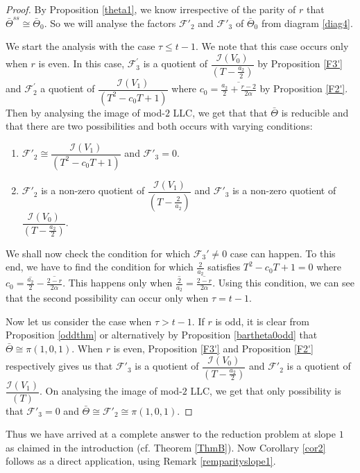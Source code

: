 \documentclass[11pt, reqno]{amsart}
\numberwithin{equation}{section}
\theoremstyle{definition}
\theoremstyle{remark}
\theoremstyle{definition}
\theoremstyle{remark}
\theoremstyle{remark}
\begin{document}
\begin{proof}
By Proposition \ref{theta1}, we know irrespective of the parity of $r$ that $\bar{\Theta}^{ss}  \cong \bar{\Theta}_{0}$. So we will analyse the factors $\mathcal{F}'_{2}$ and $\mathcal{F}'_{3}$ of $\bar{\Theta}_{0}$ from diagram \eqref{diag4}.

We start the analysis with the case $\tau \leq t-1$. We note that this case occurs only when $r$ is even. In this case, $\mathcal{F}_{3}^{'}$ is a quotient of $\dfrac{\mathcal{I}(V_{0})}{(T-\frac{a_{2}}{2})}$ by Proposition \ref{F3'} and $\mathcal{F}_{2}^{'}$ a quotient of $\dfrac{\mathcal{I}(V_{1})}{(T^{2}-c_{0}T+1)}$ where $c_{0} = \overline{\frac{a_{2}}{2} + \frac{r-2}{2\alpha}}$ by Proposition \ref{F2'}. Then by analysing the image of mod-$2$ LLC, we get that that $\bar{\Theta}$ is reducible and that there are two possibilities and both occurs with varying conditions:
\begin{enumerate}
    \item $\mathcal{F}'_{2} \cong \dfrac{\mathcal{I}(V_{1})}{(T^{2}-c_{0}T+1)}$ and $\mathcal{F}'_{3}=0$.
    \item $\mathcal{F}'_{2}$ is a non-zero quotient of $  \dfrac{\mathcal{I}(V_{1})}{(T-\frac{2}{a_{2}})}$ and 
    $\mathcal{F}'_{3}$ is a non-zero quotient of $\dfrac{\mathcal{I}(V_{0})}{(T-\frac{a_{2}}{2})}$.     
    
    \end{enumerate}

We shall now check the condition for which $\mathcal{F}_{3}'\neq 0$ case can happen. To this end, we have to find the condition for which $\frac{2}{a_{2}}$ satisfies $T^{2}-c_{0}T+1 = 0$ where $c_{0} = \overline{\frac{a_{2}}{2}}-\overline{\frac{2-r}{2\alpha}}$. This happens only when $\overline{\frac{2}{a_{2}}} = \overline{\frac{2-r}{2\alpha}}.$
Using this condition, we can see that the second possibility can occur only when $\tau=t-1$.

 Now let us consider the case when $\tau>t-1$. If $r$ is odd, it is clear from Proposition \ref{oddthm} or alternatively by Proposition \ref{bartheta0odd} that $\bar{\Theta} \cong \pi(1,0,1)$. 
 When $r$ is even,  Proposition \ref{F3'} and Proposition \ref{F2'} respectively gives us that $\mathcal{F}'_{3}$ is a quotient of $\dfrac{\mathcal{I}(V_{0})}{(T-\frac{a_{2}} {2})}$ and $\mathcal{F}'_{2}$ is a quotient of $\dfrac{\mathcal{I}(V_{1})}{(T)}$. On analysing the image of mod-$2$ LLC, we get that only possibility is that $\mathcal{F}'_{3}=0$ and $ \bar{\Theta} \cong \mathcal{F}'_{2} \cong \pi(1,0,1)$.  
\end{proof}
Thus we have arrived at a complete answer to the reduction problem at slope $1$ as claimed in the introduction (cf. Theorem \ref{ThmB}). Now Corollary \ref{cor2} follows as a direct application, using Remark \ref{remparityslope1}.
\end{document}
